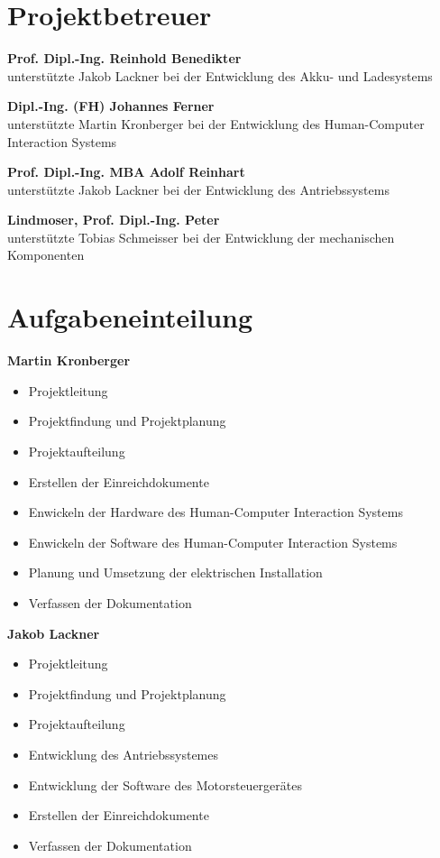 \section{Projektbetreuer}

\textbf{Prof. Dipl.-Ing. Reinhold Benedikter}\\
unterstützte Jakob Lackner bei der Entwicklung des Akku- und Ladesystems
\bigskip

\textbf{Dipl.-Ing. (FH) Johannes Ferner}\\
unterstützte Martin Kronberger bei der Entwicklung des Human-Computer Interaction Systems
\bigskip

\textbf{Prof. Dipl.-Ing. MBA Adolf Reinhart}\\
unterstützte Jakob Lackner bei der Entwicklung des Antriebssystems
\bigskip

\textbf{Lindmoser, Prof. Dipl.-Ing. Peter}\\
unterstützte Tobias Schmeisser bei der Entwicklung der mechanischen Komponenten

\section{Aufgabeneinteilung}

\textbf{Martin Kronberger}
\begin{itemize}
	\item Projektleitung
	\item Projektfindung und Projektplanung
	\item Projektaufteilung
	\item Erstellen der Einreichdokumente
	\item Enwickeln der Hardware des Human-Computer Interaction Systems
	\item Enwickeln der Software des Human-Computer Interaction Systems
	\item Planung und Umsetzung der elektrischen Installation	
	\item Verfassen der Dokumentation
\end{itemize}
\bigskip

\textbf{Jakob Lackner}
\begin{itemize}
	\item Projektleitung
	\item Projektfindung und Projektplanung
	\item Projektaufteilung
	\item Entwicklung des Antriebssystemes
	\item Entwicklung der Software des Motorsteuergerätes
	\item Erstellen der Einreichdokumente
	\item Verfassen der Dokumentation
\end{itemize}

